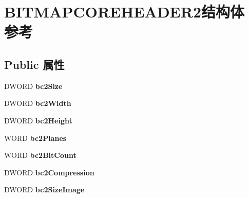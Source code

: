 \hypertarget{struct_b_i_t_m_a_p_c_o_r_e_h_e_a_d_e_r2}{}\section{B\+I\+T\+M\+A\+P\+C\+O\+R\+E\+H\+E\+A\+D\+E\+R2结构体 参考}
\label{struct_b_i_t_m_a_p_c_o_r_e_h_e_a_d_e_r2}
\subsection*{Public 属性}
\begin{DoxyCompactItemize}
\item 
\mbox{\label{struct_b_i_t_m_a_p_c_o_r_e_h_e_a_d_e_r2_ad30fd92b991b9f705931b751d350da26}} 
D\+W\+O\+RD {\bfseries bc2\+Size}
\item 
\mbox{\label{struct_b_i_t_m_a_p_c_o_r_e_h_e_a_d_e_r2_aee6692b2f053a700dc3f9fac52168d55}} 
D\+W\+O\+RD {\bfseries bc2\+Width}
\item 
\mbox{\label{struct_b_i_t_m_a_p_c_o_r_e_h_e_a_d_e_r2_a513da20e4b0147ce86d95cbe6fed1c34}} 
D\+W\+O\+RD {\bfseries bc2\+Height}
\item 
\mbox{\label{struct_b_i_t_m_a_p_c_o_r_e_h_e_a_d_e_r2_a7c22ea1dc6689830f3750506819e0ce2}} 
W\+O\+RD {\bfseries bc2\+Planes}
\item 
\mbox{\label{struct_b_i_t_m_a_p_c_o_r_e_h_e_a_d_e_r2_a76ca05898ee359ac9417a2dc13778d7e}} 
W\+O\+RD {\bfseries bc2\+Bit\+Count}
\item 
\mbox{\label{struct_b_i_t_m_a_p_c_o_r_e_h_e_a_d_e_r2_a92baa938e7bf7a4157096a3920d97553}} 
D\+W\+O\+RD {\bfseries bc2\+Compression}
\item 
\mbox{\label{struct_b_i_t_m_a_p_c_o_r_e_h_e_a_d_e_r2_aa341adf36ac945f759729c971d68ee98}} 
D\+W\+O\+RD {\bfseries bc2\+Size\+Image}
\item 
\mbox{\label{struct_b_i_t_m_a_p_c_o_r_e_h_e_a_d_e_r2_a07dbae31257d899d53d7ee92d31da7f4}} 

\end{DoxyCompactItemize}
